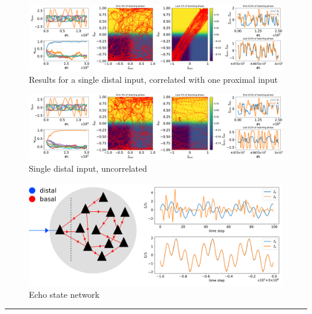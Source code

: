 \documentclass{beamer}
\begin{document}
\begin{frame}[t]
\begin{columns}[t]
\begin{column}{.5\textwidth}
\begin{figure}
\includegraphics[width=\textwidth]{../figures/fig2.pdf}
\caption{Results for a single distal input, correlated with one proximal input}
\label{fig:Results_1}
\end{figure}

\begin{figure}
\includegraphics[width=\textwidth]{../figures/fig3.pdf}
\caption{Single distal input, uncorrelated}
\label{fig:Results_2}
\end{figure}

\begin{figure}
\includegraphics[width=\textwidth]{../figures/fig4.pdf}
\caption{Echo state network}
\label{fig:Results_3}
\end{figure}

\noindent\rule{\textwidth}{2px}
\begin{small}


\end{small}
\end{column}
\end{columns}
\end{frame}
\end{document}

